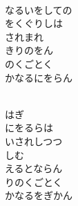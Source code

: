 \documentclass[10pt,b5j]{tarticle} %
\begin{document}
\vspace{1.5em} %
\newcommand{\linespace}{0.5em} %
\newcommand{\blocksize}{0.5\hsize} %
\newcommand{\itemmargin}{3em} %
\begin{enumerate} %
    \setlength{\itemindent}{\itemmargin} %
    \begin{minipage}[c]{\blocksize}
    
        \vspace{\linespace}
        \item~\\
        なるいをしての\\
        をくぐりしは\\
        されまれ\\
        きりのをん\\
        のくごとく\\
        かなるにをらん
        
    \end{minipage}
    \begin{minipage}[c]{\blocksize}
        
        \vspace{\linespace}
        \item~\\
        はぎ\\
        にをるらは\\
        いされしつつ\\
        しむ\\
        えるとならん\\
        りのくごとく\\
        かなるをぎかん
        
    \end{minipage}
    \begin{minipage}[c]{\blocksize}
        

\end{minipage}
\end{enumerate}
\end{document}
